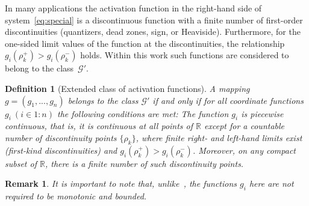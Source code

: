 \documentclass[journal]{IEEEtran}
\newtheorem{definition}{Definition}
\newtheorem{remark}{Remark}
\begin{document}
In many applications the activation function in the right-hand side of system~\eqref{eq:special}
is a discontinuous function with a finite number of first-order discontinuities (quantizers, dead zones, sign, or Heaviside).
Furthermore, for the one-sided limit values of the function at the discontinuities,
the relationship $g_i(\rho^+_k)>g_i(\rho^-_k)$ holds.
Within this work such functions are considered to belong to the class~$\mathcal{G'}$.

\smallskip
\begin{definition}[Extended class of activation functions]\label{G_n}
A mapping $g = (g_1,...,g_n)$ belongs to the class $\mathcal{G'}$ if and only if for all coordinate functions $g_i ~ (i \in 1:n)$ the following conditions are met:
The function $g_i$ is piecewise continuous, that is, it is continuous at all points of $\mathbb{R}$ except for a countable number of discontinuity points $\{\rho_k\}$, where finite right- and left-hand limits exist (first-kind discontinuities) and $g_i(\rho^+_k)>g_i(\rho^-_k)$. Moreover, on any compact subset of $\mathbb{R}$, there is a finite number of such discontinuity points.
\end{definition}
\begin{remark}
    It is important to note that, 
    unlike~\cite{p1}, the functions $g_i$ here are not required to be monotonic and bounded.
\end{remark}


\end{document}
